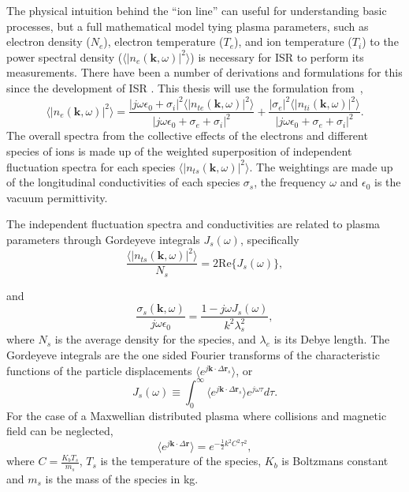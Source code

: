 The physical intuition behind the ``ion line'' can useful for understanding basic processes, but a full mathematical model tying plasma parameters, such as electron density ($N_e$), electron temperature ($T_e$),  and ion temperature ($T_i$) to the power spectral density ($\langle \left|n_e(\mathbf{k},\omega)\right|^2\rangle$) is necessary for ISR to perform its measurements. There have been a number of derivations and formulations for this since the development of ISR \cite{dougherty:farley1960,farleydougherty:ISR2,doughteryfarley:ISR3,hagfors1961}. This thesis will use the formulation from~\cite{kudeki:milla:1,kudeki:milla:2,Kudeki:2006kx},
\begin{equation}
\label{eq:mainspeceq:body}
\langle \left|n_e(\mathbf{k},\omega)\right|^2\rangle = \frac{|j\omega\epsilon_0 + \sigma_i|^2 \langle |n_{te}(\mathbf{k},\omega)|^2\rangle}{|j\omega\epsilon_0 +\sigma_e+\sigma_i|^2} + \frac{| \sigma_e|^2 \langle |n_{ti}(\mathbf{k},\omega)|^2\rangle}{|j\omega\epsilon_0 +\sigma_e+\sigma_i|^2}.
\end{equation}
The overall spectra from the collective effects of the electrons and different species of ions is made up of the weighted superposition of independent fluctuation spectra for each species $\langle |n_{ts}(\mathbf{k},\omega)|^2\rangle$. The weightings are made up of the longitudinal conductivities of each species $\sigma_s$, the frequency $\omega$ and $\epsilon_0$ is the vacuum permittivity. 

The independent fluctuation spectra and conductivities are related to plasma parameters through Gordeyeve integrals $J_s(\omega)$, specifically 
\begin{equation}
\label{eq:thermalfl:bod}
\frac{\langle|n_{ts}(\mathbf{k},\omega)|^2\rangle}{N_s} = 2\text{Re}\{J_s(\omega)\},
\end{equation}

\noindent and 
\begin{equation}
\label{eq:cond:bod}
\frac{\sigma_{s}(\mathbf{k},\omega)}{j\omega\epsilon_0} = \frac{1-j\omega J_s(\omega)}{k^2\lambda_s^2},
\end{equation}
where $N_s$ is the average density for the species, and $\lambda_{e}$ is its Debye length. The Gordeyeve integrals are the one sided Fourier transforms of the characteristic functions of the particle displacements $\langle e^{j\mathbf{k}\cdot\Delta\mathbf{r}_s}\rangle$, or  
\begin{equation}
\label{eq:gord:body}
J_s(\omega)\equiv \int_0^\infty \langle e^{j\mathbf{k}\cdot\Delta \mathbf{r}_s}\rangle e^{j\omega\tau}d\tau.
\end{equation}
For the case of a Maxwellian distributed plasma where collisions and magnetic field can be neglected,
 \begin{equation}
\label{eq:pdfallc2}
\langle e^{j\mathbf{k}\cdot\Delta \mathbf{r}}\rangle= e^{-\frac{1}{2}k^2C^2 \tau^2},
\end{equation}
where $C=\frac{K_bT_s}{m_s}$, $T_s$ is the temperature of the species, $K_b$ is Boltzmans constant and $m_s$ is the mass of the species in kg.

